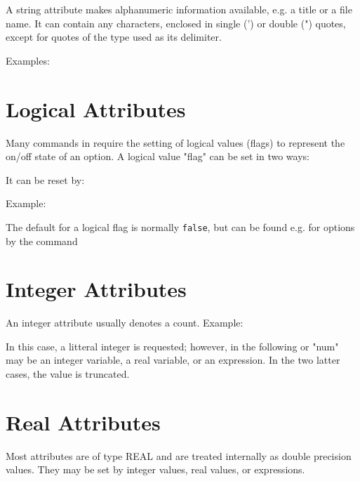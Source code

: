 
A string attribute makes alphanumeric information available, e.g. a
title or a file name. It can contain any characters, enclosed in single
(') or double (") quotes, except for quotes of the type used as its
delimiter.  

Examples: 


\section{Logical Attributes}
\label{sec:logical}
Many commands in \madx require the setting of logical values (flags) to
represent the on/off state of an option. A logical value "flag" can be
set in two ways:  

It can be reset by: 

Example: 

The default for a logical flag is normally \texttt{false}, but can be found e.g. for options by the command  


\section{Integer Attributes}
\label{sec:integer}
An integer attribute usually denotes a count. Example: 

In this case, a litteral integer is requested; however, in the following 
or 
"num" may be an integer variable, a real variable, or an expression.  In
the two latter cases, the value is truncated. 


\section{Real Attributes}
\label{sec:real}
Most attributes are of type REAL and are treated internally as double
precision values. They may be set by integer values, real values,  or
expressions. 


